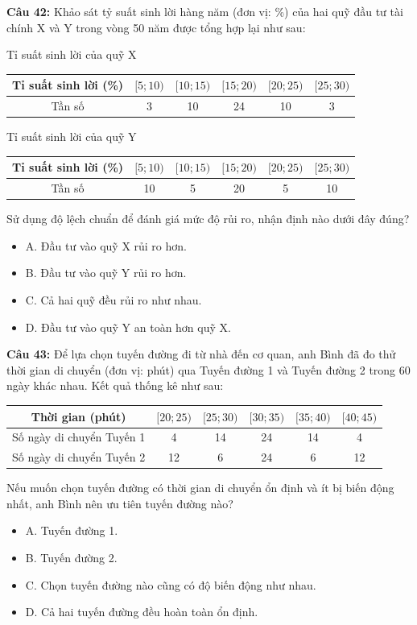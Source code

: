 \documentclass[12pt]{article}
\begin{document}
	\noindent \textbf{Câu 42:} Khảo sát tỷ suất sinh lời hàng năm (đơn vị: \%) của hai quỹ đầu tư tài chính X và Y trong vòng 50 năm được tổng hợp lại như sau:
	\begin{center}
		Tỉ suất sinh lời của quỹ X
		\renewcommand{\arraystretch}{1.3}
		\begin{tabular}{|c|c|c|c|c|c|}
			\hline
			Tỉ suất sinh lời (\%) & $[5; 10)$ & $[10; 15)$ & $[15; 20)$ & $[20; 25)$ & $[25; 30)$ \\
			\hline
			Tần số & 3 & 10 & 24 & 10 & 3 \\
			\hline
		\end{tabular}
	\end{center}
	\begin{center}
		Tỉ suất sinh lời của quỹ Y
		\renewcommand{\arraystretch}{1.3}
		\begin{tabular}{|c|c|c|c|c|c|}
			\hline
			Tỉ suất sinh lời (\%) & $[5; 10)$ & $[10; 15)$ & $[15; 20)$ & $[20; 25)$ & $[25; 30)$ \\
			\hline
			Tần số & 10 & 5 & 20 & 5 & 10 \\
			\hline
		\end{tabular}
	\end{center}
	Sử dụng độ lệch chuẩn để đánh giá mức độ rủi ro, nhận định nào dưới đây đúng?
	\begin{itemize}[label=, leftmargin=*]
		\item A. Đầu tư vào quỹ X rủi ro hơn.
		\item B. Đầu tư vào quỹ Y rủi ro hơn.
		\item C. Cả hai quỹ đều rủi ro như nhau.
		\item D. Đầu tư vào quỹ Y an toàn hơn quỹ X.
	\end{itemize}
	
	\vspace{4mm}
	
	\noindent \textbf{Câu 43:} Để lựa chọn tuyến đường đi từ nhà đến cơ quan, anh Bình đã đo thử thời gian di chuyển (đơn vị: phút) qua Tuyến đường 1 và Tuyến đường 2 trong 60 ngày khác nhau. Kết quả thống kê như sau:
	\begin{center}
		\renewcommand{\arraystretch}{1.3}
		\begin{tabular}{|c|c|c|c|c|c|}
			\hline
			Thời gian (phút) & $[20; 25)$ & $[25; 30)$ & $[30; 35)$ & $[35; 40)$ & $[40; 45)$ \\
			\hline
			Số ngày di chuyển Tuyến 1 & 4 & 14 & 24 & 14 & 4 \\
			\hline
			Số ngày di chuyển Tuyến 2 & 12 & 6 & 24 & 6 & 12 \\
			\hline
		\end{tabular}
	\end{center}
	Nếu muốn chọn tuyến đường có thời gian di chuyển ổn định và ít bị biến động nhất, anh Bình nên ưu tiên tuyến đường nào?
	\begin{itemize}[label=, leftmargin=*]
		\item A. Tuyến đường 1.
		\item B. Tuyến đường 2.
		\item C. Chọn tuyến đường nào cũng có độ biến động như nhau.
		\item D. Cả hai tuyến đường đều hoàn toàn ổn định.
	\end{itemize}
	
\end{document}
